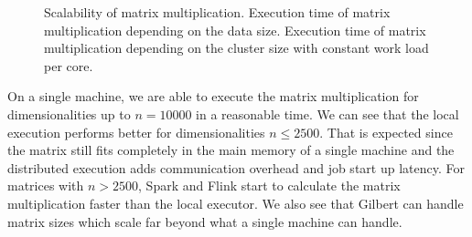\begin{figure}[htbp]
	\centering
	\begin{subfigure}{\dualpgfwidth}
		\caption{}
		\label{fig:mmLoadRuntime}
	\end{subfigure}
	\begin{subfigure}{\dualpgfwidth}
		\caption{}
		\label{fig:mmNodesRuntime}
	\end{subfigure}
	\caption{Scalability of matrix multiplication.  Execution time of matrix multiplication depending on the data size.  Execution time of matrix multiplication depending on the cluster size with constant work load per core.}
	\label{fig:mmScalability}
\end{figure}

On a single machine, we are able to execute the matrix multiplication for dimensionalities up to $n=10000$ in a reasonable time. 
We can see that the local execution performs better for dimensionalities $n \le 2500$. 
That is expected since the matrix still fits completely in the main memory of a single machine and the distributed execution adds communication overhead and job start up latency.
For matrices with $n>2500$, Spark and Flink start to calculate the matrix multiplication faster than the local executor. 
We also see that Gilbert can handle matrix sizes which scale far beyond what a single machine can handle. 

